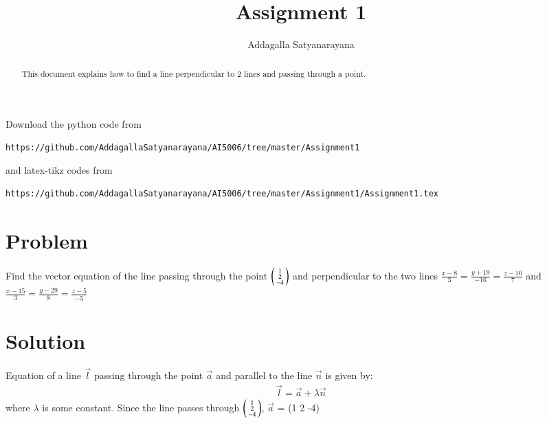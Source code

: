 \documentclass[journal,12pt,twocolumn]{IEEEtran}
\begin{document}
\renewcommand{\thefigure}{\theproblem}
\def\putbox#1#2#3{\makebox[0in][l]{\makebox[#1][l]{}\raisebox{\baselineskip}[0in][0in]{\raisebox{#2}[0in][0in]{#3}}}}
     \def\rightbox#1{\makebox[0in][r]{#1}}
     \def\centbox#1{\makebox[0in]{#1}}
     \def\topbox#1{\raisebox{-\baselineskip}[0in][0in]{#1}}
     \def\midbox#1{\raisebox{-0.5\baselineskip}[0in][0in]{#1}}
\vspace{3cm}
\title{Assignment 1}
\author{Addagalla Satyanarayana}
\maketitle
\newpage
\bigskip
\renewcommand{\thefigure}{\theenumi}
\renewcommand{\thetable}{\theenumi}
\begin{abstract}
This document explains how to find a line perpendicular to 2 lines and passing through a point.
\end{abstract}
Download the python code from 
%
\begin{lstlisting}
https://github.com/AddagallaSatyanarayana/AI5006/tree/master/Assignment1
\end{lstlisting}
%
and latex-tikz codes from 
%
\begin{lstlisting}
https://github.com/AddagallaSatyanarayana/AI5006/tree/master/Assignment1/Assignment1.tex
\end{lstlisting}
%
\section{Problem}

Find the vector equation of the line passing through the point $\begin{psmallmatrix}1 \\2 \\-4	\end{psmallmatrix}$
and perpendicular to the two lines
   	$\frac{x-8}{3} = \frac{y+19}{-16}= \frac{z-10}{7}$  and
	$\frac{x-15}{3} = \frac{y-29}{8}= \frac{z-5}{-5}$

\section{Solution}
Equation of a line $\vec{l}$ passing through the point $\vec{a}$ and parallel to the line $\vec{n}$ is given by:
\begin{align}
 \vec{l} =\vec{a} + \lambda\vec{n}   
\end{align}
where $\lambda$ is some constant.
Since the line passes through 
	$\begin{psmallmatrix}1 \\2\\-4\end{psmallmatrix} $,
$\vec{a}$ = (1  2 -4)
\end{document}
